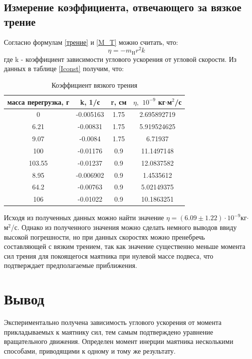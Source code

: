 \documentclass[a4paper,12pt]{article} %
\begin{document}
\subsection{Измерение коэффициента, отвечающего за вязкое трение}
Согласно формулам \ref{трение} и \ref{M_T} можно считать, что:
\begin{equation}
\eta = -m_\text{H}r^2k
\end{equation}
где k - коэффициент зависимости углового ускорения от угловой скорости. Из данных в таблице \ref{Iconst} получим, что:
\begin{table}
\caption{Коэффициент вязкого трения}
\begin{tabular}{|c|c|c|c|}
\hline 
масса перегрузка, г & k, 1/с & r, см & $\eta, $ $ 10^{-9}$ кг$\cdot$м$^2$/с\\
\hline
0 & -0.005163 & 1.75 & 2.695892719\\
\hline
6.21 & -0.00831 & 1.75 & 5.919524625\\
\hline
9.07 & -0.0084 & 1.75 & 6.71937\\
\hline
100 & -0.01176 & 0.9 & 11.1497148\\
\hline
103.55 & -0.01237 & 0.9 & 12.0837582\\
\hline
8.95 & -0.006902 & 0.9 & 1.4535612\\
\hline
64.2 & -0.00763 & 0.9 & 5.02149375\\
\hline
106 & -0.01022 & 0.9 & 10.1863251\\
\hline
\end{tabular} 
\end{table}

Исходя из полученных данных можно найти значение $\eta = (6.09 \pm 1.22) \cdot 10 ^{-9} $кг$\cdot$м$^2$/с. Однако из полученного значения можно сделать немного выводов ввиду высокой погрешности, но при данных скоростях можно пренебречь составляющей с вязким трением, так как значение существенно меньше момента сил трения для покоящегося маятника при нулевой массе подвеса, что подтверждает предполагаемые приближения.

\section{Вывод}
Экспериментально получена зависимость углового ускорения от момента прикладываемых к маятнику сил, тем самым подтверждено уравнение вращательного движения. Определен момент инерции маятника несколькими способами, приводящими к одному и тому же результату.
\end{document}
